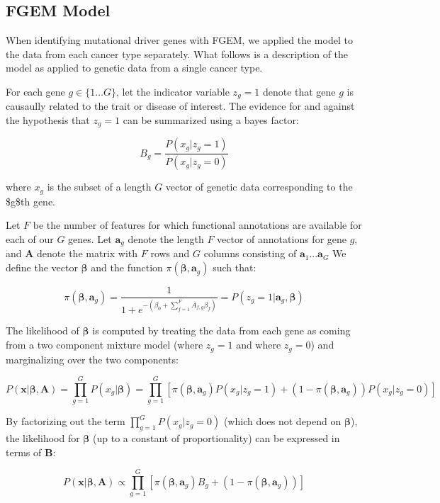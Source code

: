 \subsection{FGEM Model}\label{sec:org4e93496}

When identifying mutational driver genes with FGEM, we applied the model to the data from each cancer type separately.  What follows is a description of the model as applied to genetic data from a single cancer type.

For each gene \(g \in \{1 \dots G\}\), let the indicator variable \(z_g=1\) denote that gene \(g\) is causaully related to the trait or disease of interest.  The evidence for and against the hypothesis that \(z_g=1\) can be summarized using a bayes factor:

$$B_g=\frac{P(x_g|z_g=1)}{P(x_g|z_g=0)}$$

where \(x_g\) is the subset of a length $G$ vector of genetic data corresponding to the \$g\$th gene.

Let \(F\) be the number of features for which functional annotations are available for each of our \(G\) genes.  Let \(\textbf{a}_g\) denote the length \(F\) vector of annotations for gene \(g\), and \(\textbf{A}\) denote the matrix with \(F\) rows and \(G\) 
columns consisting of \(\textbf{a}_1 ...  \textbf{a}_G\)
We define the vector \(\boldsymbol{\beta}\) and the function \(\pi(\boldsymbol{\beta},\textbf{a}_g)\) such that:

$$\pi(\boldsymbol{\beta},\textbf{a}_g) =  \frac{1}{1+e^{-(\beta_{0}+\sum_{f=1}^F{A_{f,g}\beta_f})}} =  P(z_g=1|\textbf{a}_g,\boldsymbol{\beta})$$

The likelihood of \(\boldsymbol{\beta}\) is computed by treating the data from each gene as coming from a two component mixture model (where \(z_g=1\) and where \(z_g=0\)) and marginalizing over the two components:

$$ P(\textbf{x}|\boldsymbol{\beta},\textbf{A})=\prod_{g=1}^{G}P(x_g|\boldsymbol{\beta})=\prod_{g=1}^{G}[\pi(\boldsymbol{\beta},\textbf{a}_g) P(x_g|z_g=1)+(1-\pi(\boldsymbol{\beta},\textbf{a}_g))P(x_g|z_g=0)]$$

By factorizing out the term \(\prod_{g=1}^{G} P(x_g|z_g=0)\) (which does not depend on $\boldsymbol{\beta}$), the likelihood for \(\boldsymbol{\beta}\) (up to a constant of proportionality) can be expressed in terms of \(\textbf{B}\):

$$P(\textbf{x}|\boldsymbol{\beta},\textbf{A}) \propto \prod_{g=1}^{G}[\pi(\boldsymbol{\beta},\textbf{a}_g)B_g+(1-\pi(\boldsymbol{\beta},\textbf{a}_g))]$$

